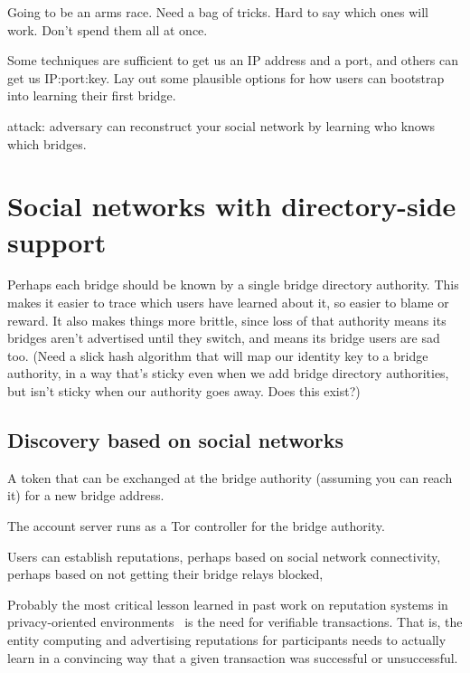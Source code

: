 \documentclass{llncs}
\begin{document}
Going to be an arms race. Need a bag of tricks. Hard to say
which ones will work. Don't spend them all at once.

Some techniques are sufficient to get us an IP address and a port,
and others can get us IP:port:key. Lay out some plausible options
for how users can bootstrap into learning their first bridge.

attack: adversary can reconstruct your social network by learning who
knows which bridges.






\section{Social networks with directory-side support}
\label{sec:accounts}

Perhaps each bridge should be known by a single bridge directory
authority. This makes it easier to trace which users have learned about
it, so easier to blame or reward. It also makes things more brittle,
since loss of that authority means its bridges aren't advertised until
they switch, and means its bridge users are sad too.
(Need a slick hash algorithm that will map our identity key to a
bridge authority, in a way that's sticky even when we add bridge
directory authorities, but isn't sticky when our authority goes
away. Does this exist?)

\subsection{Discovery based on social networks}

A token that can be exchanged at the bridge authority (assuming you
can reach it) for a new bridge address.

The account server runs as a Tor controller for the bridge authority.

Users can establish reputations, perhaps based on social network
connectivity, perhaps based on not getting their bridge relays blocked,

Probably the most critical lesson learned in past work on reputation
systems in privacy-oriented environments~\cite{rep-anon} is the need for
verifiable transactions. That is, the entity computing and advertising
reputations for participants needs to actually learn in a convincing
way that a given transaction was successful or unsuccessful.
\end{document}
